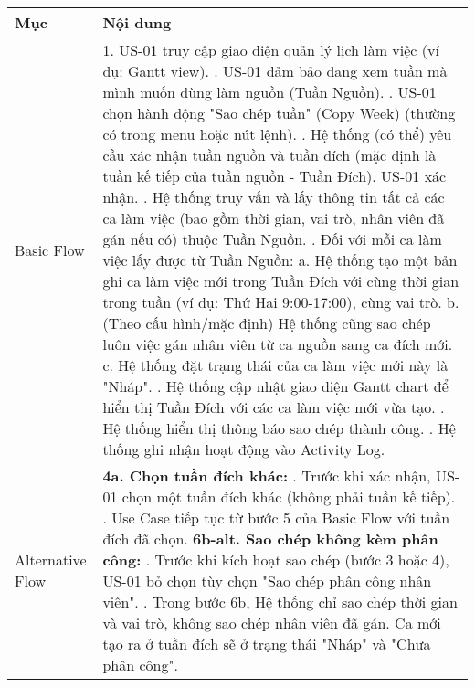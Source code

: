 \begin{longtable}{|m{4cm}|p{11cm}|}
\textbf{Mục} & \textbf{Nội dung} \\
\hline
Basic Flow & 1. US-01 truy cập giao diện quản lý lịch làm việc (ví dụ: Gantt view). \newline 2. US-01 đảm bảo đang xem tuần mà mình muốn dùng làm nguồn (Tuần Nguồn). \newline 3. US-01 chọn hành động "Sao chép tuần" (Copy Week) (thường có trong menu hoặc nút lệnh). \newline 4. Hệ thống (có thể) yêu cầu xác nhận tuần nguồn và tuần đích (mặc định là tuần kế tiếp của tuần nguồn - Tuần Đích). US-01 xác nhận. \newline 5. Hệ thống truy vấn và lấy thông tin tất cả các ca làm việc (bao gồm thời gian, vai trò, nhân viên đã gán nếu có) thuộc Tuần Nguồn. \newline 6. Đối với mỗi ca làm việc lấy được từ Tuần Nguồn: \newline    a. Hệ thống tạo một bản ghi ca làm việc mới trong Tuần Đích với cùng thời gian trong tuần (ví dụ: Thứ Hai 9:00-17:00), cùng vai trò. \newline    b. (Theo cấu hình/mặc định) Hệ thống cũng sao chép luôn việc gán nhân viên từ ca nguồn sang ca đích mới. \newline    c. Hệ thống đặt trạng thái của ca làm việc mới này là "Nháp". \newline 7. Hệ thống cập nhật giao diện Gantt chart để hiển thị Tuần Đích với các ca làm việc mới vừa tạo. \newline 8. Hệ thống hiển thị thông báo sao chép thành công. \newline 9. Hệ thống ghi nhận hoạt động vào Activity Log. \\
\hline
Alternative Flow & \textbf{4a. Chọn tuần đích khác:} \newline    1. Trước khi xác nhận, US-01 chọn một tuần đích khác (không phải tuần kế tiếp). \newline    2. Use Case tiếp tục từ bước 5 của Basic Flow với tuần đích đã chọn. \newline \textbf{6b-alt. Sao chép không kèm phân công:} \newline    1. Trước khi kích hoạt sao chép (bước 3 hoặc 4), US-01 bỏ chọn tùy chọn "Sao chép phân công nhân viên". \newline    2. Trong bước 6b, Hệ thống chỉ sao chép thời gian và vai trò, không sao chép nhân viên đã gán. Ca mới tạo ra ở tuần đích sẽ ở trạng thái "Nháp" và "Chưa phân công". \\
\hline

\end{longtable}

